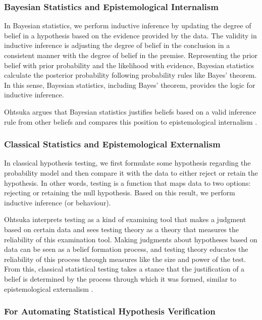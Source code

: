 \documentclass{article}
\begin{document}
\subsubsection{Bayesian Statistics and Epistemological Internalism}
In Bayesian statistics, we perform inductive inference by updating the degree of belief in a hypothesis based on the evidence provided by the data. The validity in inductive inference is adjusting the degree of belief in the conclusion in a consistent manner with the degree of belief in the premise. Representing the prior belief with prior probability and the likelihood with evidence, Bayesian statistics calculate the posterior probability following probability rules like Bayes' theorem. In this sense, Bayesian statistics, including Bayes' theorem, provides the logic for inductive inference. 

Ohtsuka argues that Bayesian statistics justifies beliefs based on a valid inference rule from other beliefs and compares this position to epistemological internalism \cite{otsuka2022thinking}.

\subsubsection{Classical Statistics and Epistemological Externalism}
In classical hypothesis testing, we first formulate some hypothesis regarding the probability model and then compare it with the data to either reject or retain the hypothesis. In other words, testing is a function that maps data to two options: rejecting or retaining the null hypothesis. Based on this result, we perform inductive inference (or behaviour). 

Ohtsuka interprets testing as a kind of examining tool that makes a judgment based on certain data and sees testing theory as a theory that measures the reliability of this examination tool. Making judgments about hypotheses based on data can be seen as a belief formation process, and testing theory educates the reliability of this process through measures like the size and power of the test. From this, classical statistical testing takes a stance that the justification of a belief is determined by the process through which it was formed, similar to epistemological externalism \cite{otsuka2022thinking}.

\subsubsection{For Automating Statistical Hypothesis Verification}
\end{document}
